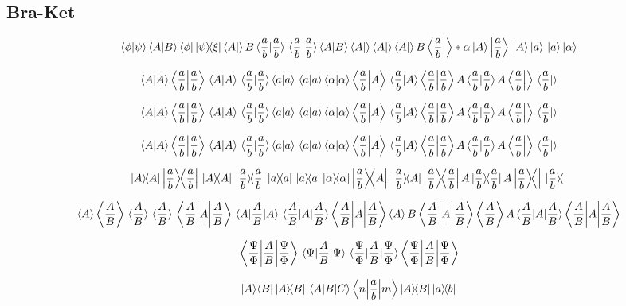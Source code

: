 \documentclass{article}
\begin{document}
\newpage
\subsection*{Bra-Ket}

\[
  \bra{\phi}\ket{\psi}
  \bra{A}\ket{B}
  \bra{\phi}\dyad{\psi}{\xi}
  \bra A  \ket B
  \bra*{\frac{a}{b}}  \ket{\frac{a}{b}}
  \bra{\frac{a}{b}}  \ket*{\frac{a}{b}}
  \bra A\ket{B}
  \bra A\ket 
  \bra {A}\ket 
  \bra {A}\ket B
  \bra {\frac{a}{b}} \ket* \alpha
  \ket{A}
  \ket{\frac{a}{b}}
  \ket*{A}
  \ket a
  \ket* a
  \ket \alpha
\]

\[
  \innerproduct{A}
  \innerproduct{\frac{a}{b}}
  \innerproduct*{A}
  \innerproduct*{\frac{a}{b}}
  \innerproduct a
  \innerproduct* a
  \innerproduct \alpha
  \innerproduct{\frac{a}{b}}{A}
  \innerproduct*{\frac{a}{b}}{A}
  \innerproduct{\frac{a}{b}}  A
  \innerproduct*{\frac{a}{b}}   A
  \innerproduct{\frac{a}{b}}{} 
  \innerproduct*{\frac{a}{b}}{}
\]

\[
  \ip{A}
  \ip{\frac{a}{b}}
  \ip*{A}
  \ip*{\frac{a}{b}}
  \ip a
  \ip* a
  \ip \alpha
  \ip{\frac{a}{b}}{A}
  \ip*{\frac{a}{b}}{A}
  \ip{\frac{a}{b}}  A
  \ip*{\frac{a}{b}}   A
  \ip{\frac{a}{b}}{} 
  \ip*{\frac{a}{b}}{}
\]

\[
  \braket{A}
  \braket{\frac{a}{b}}
  \braket*{A}
  \braket*{\frac{a}{b}}
  \braket a
  \braket* a
  \braket \alpha
  \braket{\frac{a}{b}}{A}
  \braket*{\frac{a}{b}}{A}
  \braket{\frac{a}{b}}  A
  \braket*{\frac{a}{b}}   A
  \braket{\frac{a}{b}}{} 
  \braket*{\frac{a}{b}}{}
\]

\[
  \ketbra{A}
  \ketbra{\frac{a}{b}}
  \ketbra*{A}
  \ketbra*{\frac{a}{b}}
  \ketbra a
  \ketbra* a
  \ketbra \alpha
  \ketbra{\frac{a}{b}}{A}
  \ketbra*{\frac{a}{b}}{A}
  \ketbra{\frac{a}{b}}  A
  \ketbra*{\frac{a}{b}}   A
  \ketbra{\frac{a}{b}}{} 
  \ketbra*{\frac{a}{b}}{}
\]

\[
  \ev{A}
  \ev{\frac{A}{B}}
  \ev*{\frac{A}{B}}
  \ev**{\frac{A}{B}}
  \ev{A}{\frac{A}{B}}
  \ev{\frac{A}{B}}{A}
  \ev*{A}{\frac{A}{B}}
  \ev**{A} {\frac{A}{B}}
  \ev A B
  \ev A {\frac{A}{B}}
  \ev {\frac{A}{B}} A
  \ev* A {\frac{A}{B}}
  \ev** A {\frac{A}{B}}
\]

\[
  \ev{\frac{A}{B}}{\frac{\Psi}{\Phi}}
  \ev{\frac{A}{B}}{{\Psi}}
  \ev*{\frac{A}{B}}{\frac{\Psi}{\Phi}}
  \ev**{\frac{A}{B}}{\frac{\Psi}{\Phi}}
\]


\[
  \left\vert A \middle\rangle\middle\langle B\right\vert
  \ketbra{A}{B}
  \mel A B C
  \mel**{n}{\frac{a}{b}}{m}
  \outerproduct{A}{B}
  \dyad{a}{b}
\]
\end{document}
